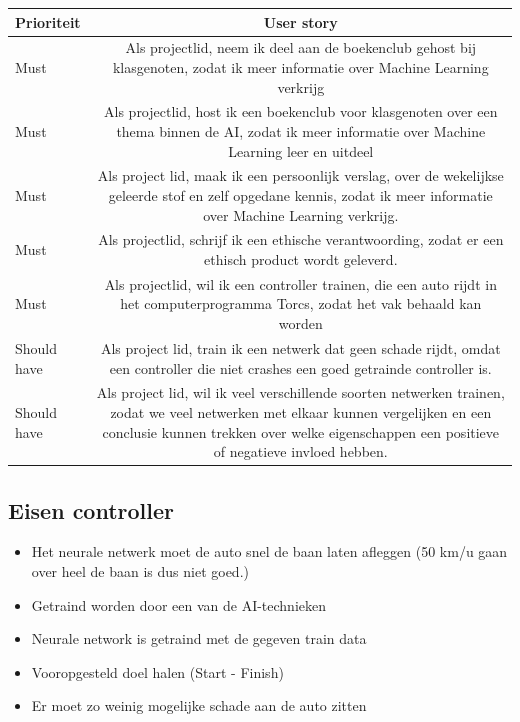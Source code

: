 \documentclass{article}
\begin{document}
\begin{table}[h]
\begin{tabularx}{\textwidth}{l C}
\textbf{Prioriteit} & \textbf{User story}\\ \hline
Must & Als projectlid, neem ik deel aan de boekenclub gehost bij klasgenoten,
zodat ik meer informatie over Machine Learning verkrijg\\ \hline
Must & Als projectlid, host ik een boekenclub voor klasgenoten over een thema binnen de AI, zodat ik meer informatie over Machine Learning leer en uitdeel\\\hline
Must & Als project lid, maak ik een persoonlijk verslag, over de wekelijkse geleerde stof en zelf opgedane kennis, zodat ik meer informatie over Machine Learning verkrijg. \\\hline
Must & Als projectlid, schrijf ik een ethische verantwoording, zodat er een ethisch product wordt geleverd. \\\hline
Must & Als projectlid, wil ik een controller trainen, die een auto rijdt in het computerprogramma Torcs, zodat het vak behaald kan worden \\\hline
Should have & Als project lid, train ik een netwerk dat geen schade rijdt, omdat een controller die niet crashes een goed getrainde controller is. \\\hline
Should have & Als project lid, wil ik veel verschillende soorten netwerken trainen, zodat we veel netwerken met elkaar kunnen vergelijken en een conclusie kunnen trekken over welke eigenschappen een positieve of negatieve invloed hebben. \\
\end{tabularx}
\end{table}
 
\subsection*{Eisen controller}
\begin{itemize}
\item Het neurale netwerk moet de auto snel de baan laten afleggen (50 km/u gaan over heel de baan is dus niet goed.)
\item Getraind worden door een van de AI-technieken
\item Neurale network is getraind met de gegeven train data
\item Vooropgesteld doel halen (Start - Finish)
\item Er moet zo weinig mogelijke schade aan de auto zitten
\end{itemize}
\end{document}
